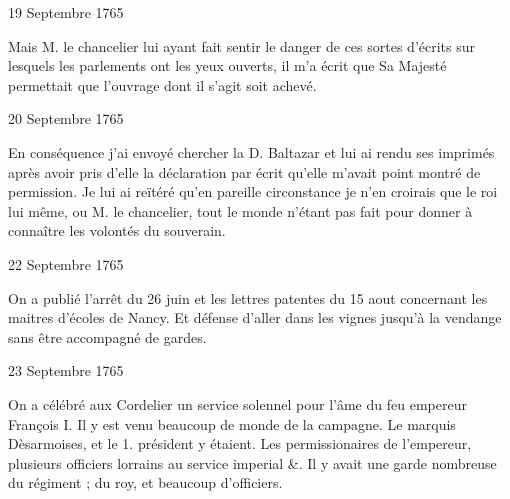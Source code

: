                      \begin{diary}{19 Septembre 1765}{}
                        
                         Mais M. le chancelier lui ayant fait
                           sentir le danger de ces sortes d'écrits sur
                           lesquels les parlements ont les yeux ouverts,
                           il m'a écrit que Sa Majesté permettait que l'ouvrage
                           dont il s'agit soit achevé. \bigskip
        
        
                     \end{diary}

                     \begin{diary}{20 Septembre 1765}{}
                        
                         En conséquence j'ai envoyé chercher la
                           D.
                              Baltazar et lui ai rendu ses imprimés
                           après avoir pris d'elle la déclaration par
                           écrit qu'elle m'avait point montré de
                           permission. Je lui ai reïtéré qu'en pareille
                           circonstance je n'en croirais que le roi
                           lui même, ou M. le
                              chancelier, tout le
                           monde n'étant pas fait pour donner
                           à connaître les volontés du souverain. \bigskip
        
        
                     \end{diary}
                     
                     

                     \begin{diary}{22 Septembre 1765}{}
                        
                         On a publié l'arrêt du 26 juin et les lettres patentes
                           du 15 aout concernant les maitres
                           d'écoles de
                           Nancy. Et défense d'aller dans les vignes jusqu'à
                           la vendange sans être accompagné de gardes. \bigskip
        
        
                     \end{diary}

                     \begin{diary}{23 Septembre 1765}{}
                        
                         On a célébré aux Cordelier un service solennel
                           pour l'âme du feu empereur
                              François I. Il y est
                           venu beaucoup de monde de la campagne. Le
                              marquis Dèsarmoises, et le 1. président y étaient. Les
                           permissionaires de l'empereur, plusieurs officiers lorrains
                           au service imperial &. Il y avait une garde
                           nombreuse du régiment ; du roy, et beaucoup d'officiers. \bigskip
        
        
                     \end{diary}

